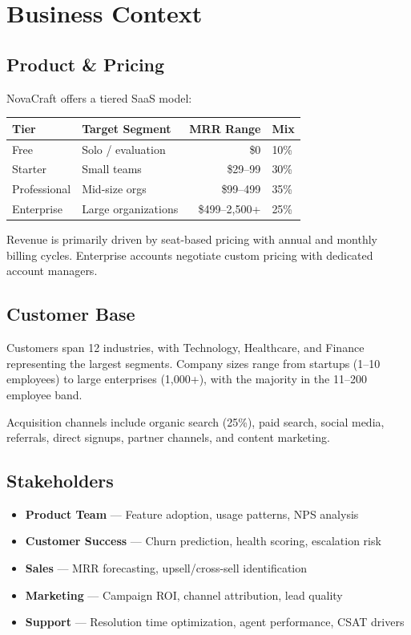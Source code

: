 \documentclass[11pt,a4paper]{article}
\begin{document}
\section{Business Context}

\subsection{Product \& Pricing}

NovaCraft offers a tiered SaaS model:

\begin{center}
\begin{tabular}{llrl}
    \toprule
    \textbf{Tier} & \textbf{Target Segment} & \textbf{MRR Range} & \textbf{Mix} \\
    \midrule
    Free         & Solo / evaluation      & \$0           & 10\% \\
    Starter      & Small teams            & \$29--99      & 30\% \\
    Professional & Mid-size orgs          & \$99--499     & 35\% \\
    Enterprise   & Large organizations    & \$499--2,500+ & 25\% \\
    \bottomrule
\end{tabular}
\end{center}

Revenue is primarily driven by seat-based pricing with annual and monthly billing
cycles. Enterprise accounts negotiate custom pricing with dedicated account managers.

\subsection{Customer Base}

Customers span 12 industries, with Technology, Healthcare, and Finance representing
the largest segments. Company sizes range from startups (1--10 employees) to large
enterprises (1,000+), with the majority in the 11--200 employee band.

Acquisition channels include organic search (25\%), paid search, social media,
referrals, direct signups, partner channels, and content marketing.

\subsection{Stakeholders}

\begin{itemize}[nosep]
    \item \textbf{Product Team} — Feature adoption, usage patterns, NPS analysis
    \item \textbf{Customer Success} — Churn prediction, health scoring, escalation risk
    \item \textbf{Sales} — MRR forecasting, upsell/cross-sell identification
    \item \textbf{Marketing} — Campaign ROI, channel attribution, lead quality
    \item \textbf{Support} — Resolution time optimization, agent performance, CSAT drivers
\end{itemize}
\end{document}
